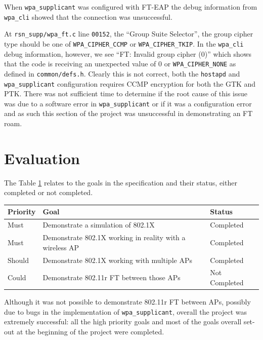 \documentclass[pdftex, 12pt, a4paper]{article}
\begin{document}
When \verb`wpa_supplicant` was configured with FT-EAP the debug information from \verb`wpa_cli` showed that the connection was unsuccessful.

At \verb`rsn_supp/wpa_ft.c` line \verb`00152`, the ``Group Suite Selector'', the group cipher type should be one of \verb`WPA_CIPHER_CCMP` or \verb`WPA_CIPHER_TKIP`.  In the \verb`wpa_cli` debug information, however, we see ``FT: Invalid group cipher (0)'' which shows that the code is receiving an unexpected value of 0 or \verb`WPA_CIPHER_NONE` as defined in \verb`common/defs.h`.  Clearly this is not correct, both the \verb`hostapd` and \verb`wpa_supplicant` configuration requires CCMP encryption for both the GTK and PTK. There was not sufficient time to determine if the root cause of this issue was due to a software error in \verb`wpa_supplicant` or if it was a configuration error and as such this section of the project was unsuccessful in demonstrating an FT roam.

\section{Evaluation}
The Table \ref{tab:evaluation} relates to the goals in the specification and their status, either completed or not completed.

\begin{table}[!hb]
    \label{tab:evaluation}
    \begin{tabular}{|l|l|l|}
        \hline
        Priority & Goal                                                     & Status        \\ \hline
        Must     & Demonstrate a simulation of 802.1X                       & Completed     \\ 
        Must     & Demonstrate 802.1X working in reality with a wireless AP & Completed     \\ 
        Should   & Demonstrate 802.1X working with multiple APs             & Completed     \\ 
        Could    & Demonstrate 802.11r FT between those APs                 & Not Completed \\
        \hline
    \end{tabular}
\end{table}

Although it was not possible to demonstrate 802.11r FT between APs, possibly due to bugs in the implementation of \verb`wpa_supplicant`, overall the project was extremely successful: all the high priority goals and most of the goals overall set-out at the beginning of the project were completed.
\end{document}
